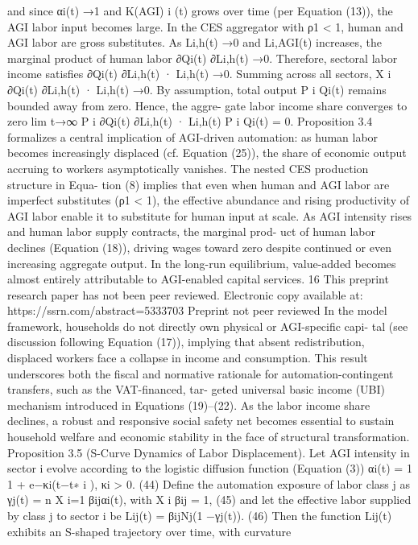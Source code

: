 and since αi(t) →1 and K(AGI)
i
(t) grows over time (per Equation (13)), the AGI labor
input becomes large. In the CES aggregator with ρ1 < 1, human and AGI labor are gross
substitutes. As Li,h(t) →0 and Li,AGI(t) increases, the marginal product of human labor
∂Qi(t)
∂Li,h(t) →0. Therefore, sectoral labor income satisfies
∂Qi(t)
∂Li,h(t) · Li,h(t) →0.
Summing across all sectors,
X
i
∂Qi(t)
∂Li,h(t) · Li,h(t) →0.
By assumption, total output P
i Qi(t) remains bounded away from zero. Hence, the aggre-
gate labor income share converges to zero
lim
t→∞
P
i
∂Qi(t)
∂Li,h(t) · Li,h(t)
P
i Qi(t)
= 0.
Proposition 3.4 formalizes a central implication of AGI-driven automation: as human
labor becomes increasingly displaced (cf.
Equation (25)), the share of economic output
accruing to workers asymptotically vanishes. The nested CES production structure in Equa-
tion (8) implies that even when human and AGI labor are imperfect substitutes (ρ1 < 1), the
effective abundance and rising productivity of AGI labor enable it to substitute for human
input at scale. As AGI intensity rises and human labor supply contracts, the marginal prod-
uct of human labor declines (Equation (18)), driving wages toward zero despite continued or
even increasing aggregate output. In the long-run equilibrium, value-added becomes almost
entirely attributable to AGI-enabled capital services.
16
This preprint research paper has not been peer reviewed. Electronic copy available at: https://ssrn.com/abstract=5333703
Preprint not peer reviewed
In the model framework, households do not directly own physical or AGI-specific capi-
tal (see discussion following Equation (17)), implying that absent redistribution, displaced
workers face a collapse in income and consumption. This result underscores both the fiscal
and normative rationale for automation-contingent transfers, such as the VAT-financed, tar-
geted universal basic income (UBI) mechanism introduced in Equations (19)–(22). As the
labor income share declines, a robust and responsive social safety net becomes essential to
sustain household welfare and economic stability in the face of structural transformation.
Proposition 3.5 (S-Curve Dynamics of Labor Displacement). Let AGI intensity in sector
i evolve according to the logistic diffusion function (Equation (3))
αi(t) =
1
1 + e−κi(t−t∗
i ),
κi > 0.
(44)
Define the automation exposure of labor class j as
γj(t) =
n
X
i=1
βijαi(t),
with
X
i
βij = 1,
(45)
and let the effective labor supplied by class j to sector i be
Lij(t) = βijNj(1 −γj(t)).
(46)
Then the function Lij(t) exhibits an S-shaped trajectory over time, with curvature
